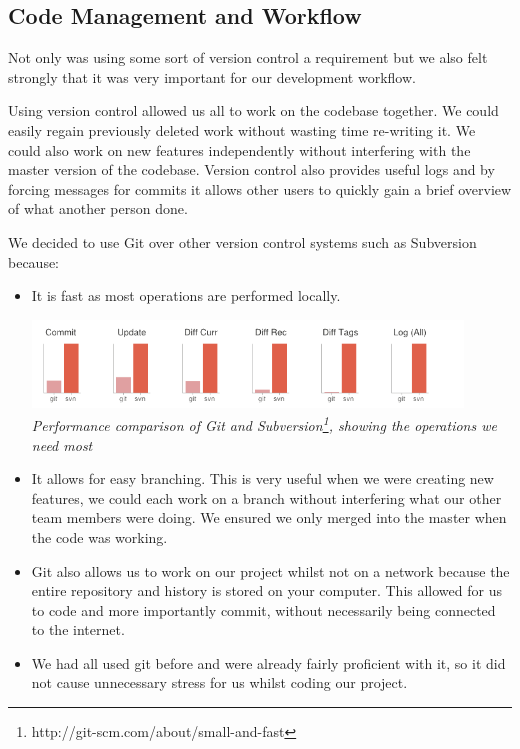 \documentclass[a4wide, 11pt]{article}
\begin{document}
\subsection{Code Management and Workflow}

Not only was using some sort of version control a requirement but we also felt strongly that it was very important for our development workflow.

Using version control allowed us all to work on the codebase together. We could easily regain previously deleted work without wasting time re-writing it. We could also work on new features independently without interfering with the master version of the codebase. Version control also provides useful logs and by forcing messages for commits it allows other users to quickly gain a brief overview of what another person done.

We decided to use Git over other version control systems such as Subversion because:
  \begin{itemize}
    \item
      It is fast as most operations are performed locally.
      
        \begin{center}
          \includegraphics[width=0.9\textwidth]{images/git_compare.png} \\
          \emph{Performance comparison of Git and Subversion\footnote{http://git-scm.com/about/small-and-fast}, showing the operations we need most}
        \end{center}
        
    \item
      It allows for easy branching. This is very useful when we were creating new features, we could each work on a branch without interfering what our other team members were doing. We ensured we only merged into the master when the code was working.
    \item
      Git also allows us to work on our project whilst not on a network because the entire repository and history is stored on your computer. This allowed for us to code and more importantly commit, without necessarily being connected to the internet.
    \item
      We had all used git before and were already fairly proficient with it, so it did not cause unnecessary stress for us whilst coding our project.
  
  \end{itemize}
\end{document}
